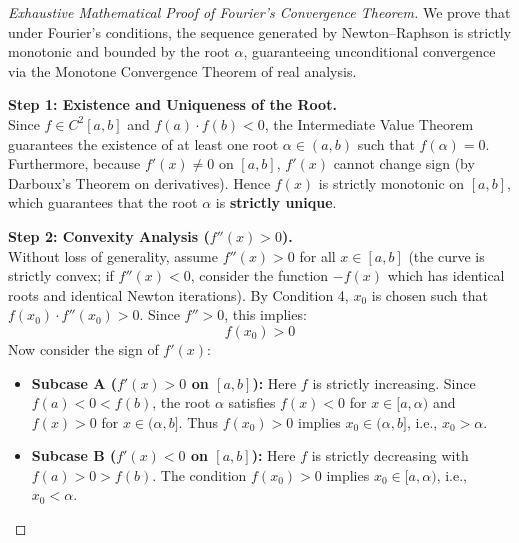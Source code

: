 \begin{proof}[Exhaustive Mathematical Proof of Fourier's Convergence Theorem]
We prove that under Fourier's conditions, the sequence generated by Newton--Raphson is strictly monotonic and bounded by the root $\alpha$, guaranteeing unconditional convergence via the Monotone Convergence Theorem of real analysis.

\medskip
\noindent\textbf{Step 1: Existence and Uniqueness of the Root.} \\
Since $f \in C^2[a, b]$ and $f(a) \cdot f(b) < 0$, the Intermediate Value Theorem guarantees the existence of at least one root $\alpha \in (a, b)$ such that $f(\alpha) = 0$.
Furthermore, because $f'(x) \ne 0$ on $[a, b]$, $f'(x)$ cannot change sign (by Darboux's Theorem on derivatives). Hence $f(x)$ is strictly monotonic on $[a, b]$, which guarantees that the root $\alpha$ is \textbf{strictly unique}.

\medskip
\noindent\textbf{Step 2: Convexity Analysis ($f''(x) > 0$).} \\
Without loss of generality, assume $f''(x) > 0$ for all $x \in [a, b]$ (the curve is strictly convex; if $f''(x) < 0$, consider the function $-f(x)$ which has identical roots and identical Newton iterations).
By Condition 4, $x_0$ is chosen such that $f(x_0) \cdot f''(x_0) > 0$. Since $f'' > 0$, this implies:
\begin{equation}
    f(x_0) > 0
\end{equation}
Now consider the sign of $f'(x)$:
\begin{itemize}
    \item \textbf{Subcase A ($f'(x) > 0$ on $[a, b]$):}
    Here $f$ is strictly increasing. Since $f(a) < 0 < f(b)$, the root $\alpha$ satisfies $f(x) < 0$ for $x \in [a, \alpha)$ and $f(x) > 0$ for $x \in (\alpha, b]$.
    Thus $f(x_0) > 0$ implies $x_0 \in (\alpha, b]$, i.e., $x_0 > \alpha$.
    
    \item \textbf{Subcase B ($f'(x) < 0$ on $[a, b]$):}
    Here $f$ is strictly decreasing with $f(a) > 0 > f(b)$. The condition $f(x_0) > 0$ implies $x_0 \in [a, \alpha)$, i.e., $x_0 < \alpha$.
\end{itemize}


\end{proof}
